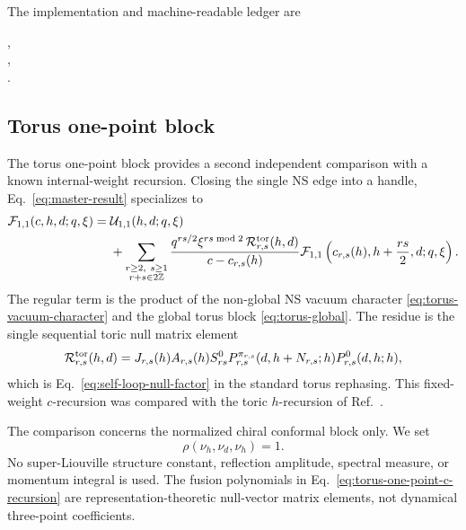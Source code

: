 \documentclass[11pt]{article}
\newcommand{\F}{\mathcal F}
\newcommand{\U}{\mathcal U}
\newcommand{\Rcal}{\mathcal R}
\begin{document}
The implementation and machine-readable ledger are
\begin{center}
 ,\\
 ,\\
 .
\end{center}

\subsection{\texorpdfstring{Torus one-point block}
{Torus one-point block}}
\label{sec:torus-one-point-c-h-check}

The torus one-point block provides a second independent comparison with a
known internal-weight recursion.  Closing the single NS edge into a handle,
Eq.~\eqref{eq:master-result} specializes to
\begin{align}
 \F_{1,1}(c,h,d;q,\xi)
 ={}&\U_{1,1}(h,d;q,\xi)\nonumber\\
 &+\sum_{\substack{r\geq2,\ s\geq1\\r+s\in2\mathbb Z}}
 \frac{q^{rs/2}\xi^{rs\bmod2}\,
       \Rcal_{r,s}^{\rm tor}(h,d)}
      {c-c_{r,s}(h)}
 \F_{1,1}\left(c_{r,s}(h),h+\frac{rs}{2},d;q,\xi\right).
 \label{eq:torus-one-point-c-recursion}
\end{align}
The regular term is the product of the non-global NS vacuum character
\eqref{eq:torus-vacuum-character} and the global torus block
\eqref{eq:torus-global}.  The residue is the single sequential toric null
matrix element
\begin{equation}
 \Rcal_{r,s}^{\rm tor}(h,d)
 =J_{r,s}(h)A_{r,s}(h)S_{rs}^{0}
  P_{r,s}^{\pi_{r,s}}(d,h+N_{r,s};h)
  P_{r,s}^{0}(d,h;h),
 \label{eq:torus-sequential-residue}
\end{equation}
which is Eq.~\eqref{eq:self-loop-null-factor} in the standard torus rephasing.
This
fixed-weight \(c\)-recursion was compared with the toric \(h\)-recursion of
Ref.~\cite{HadaszJaskolskiSuchanek2012Toric}.

The comparison concerns the normalized chiral conformal block only.  We set
\begin{equation}
 \rho(\nu_h,\nu_d,\nu_h)=1.
 \label{eq:torus-primary-three-form-normalization}
\end{equation}
No super-Liouville structure constant, reflection amplitude, spectral
measure, or momentum integral is used.  The fusion polynomials in
Eq.~\eqref{eq:torus-one-point-c-recursion} are representation-theoretic
null-vector matrix elements, not dynamical three-point coefficients.
\end{document}
